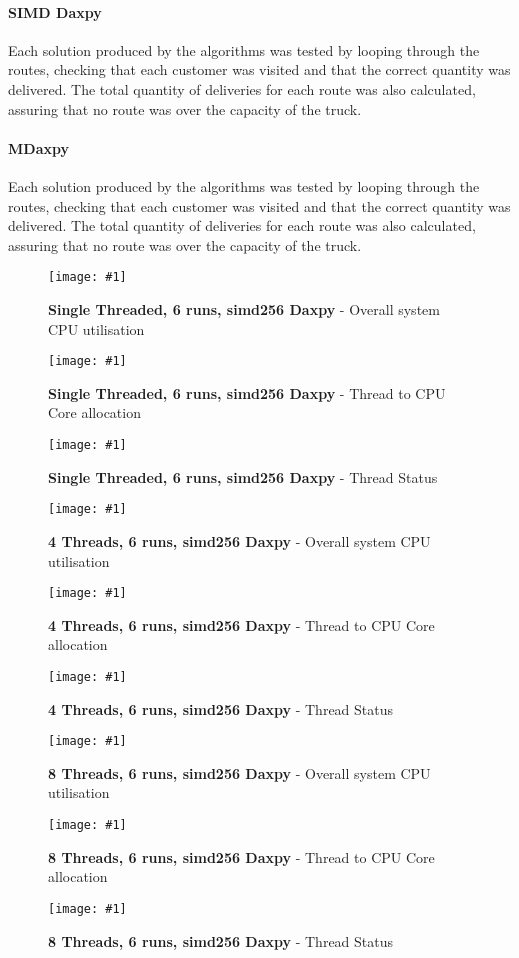\documentclass[conference]{acmsiggraph}
\newcommand{\figuremacroF}[4]{
	\begin{figure*}[t] %
		\centering
		\texttt{[image: \#1]}
		\caption[#2]{\textbf{#2} - #3}
		\label{fig:#1}
	\end{figure*}
}
\begin{document}
\paragraph{SIMD Daxpy}
Each solution produced by the algorithms was tested by looping through the routes, checking that each customer was visited and that the correct quantity was delivered. The total quantity of deliveries for each route was also calculated, assuring that no route was over the capacity of the truck.

\paragraph{MDaxpy}
Each solution produced by the algorithms was tested by looping through the routes, checking that each customer was visited and that the correct quantity was delivered. The total quantity of deliveries for each route was also calculated, assuring that no route was over the capacity of the truck.

\afterpage{\clearpage}

\figuremacroF
{t1i8simd256conc}
{Single Threaded, 6 runs, simd256 Daxpy}
{Overall system CPU utilisation}
{1.0}

\figuremacroF
{t1i8simd256cond}
{Single Threaded, 6 runs, simd256 Daxpy}
{Thread to CPU Core allocation}
{1.0}

\figuremacroF
{t1i8simd256conp}
{Single Threaded, 6 runs, simd256 Daxpy}
{Thread Status}
{1.0}

\figuremacroF
{t4i8simd256conc}
{4 Threads, 6 runs, simd256 Daxpy}
{Overall system CPU utilisation}
{1.0}

\figuremacroF
{t4i8simd256cond}
{4 Threads, 6 runs, simd256 Daxpy}
{Thread to CPU Core allocation}
{1.0}

\figuremacroF
{t4i8simd256conp}
{4 Threads, 6 runs, simd256 Daxpy}
{Thread Status}
{1.0}

\figuremacroF
{t8i8simd256conc}
{8 Threads, 6 runs, simd256 Daxpy}
{Overall system CPU utilisation}
{1.0}

\figuremacroF
{t8i8simd256cond}
{8 Threads, 6 runs, simd256 Daxpy}
{Thread to CPU Core allocation}
{1.0}

\figuremacroF
{t8i8simd256conp}
{8 Threads, 6 runs, simd256 Daxpy}
{Thread Status}
{1.0}

\clearpage
\end{document}
